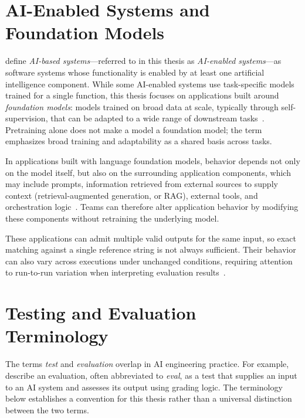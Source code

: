 \section{AI-Enabled Systems and Foundation Models}
\label{sec:background-ai}

\textcite{Martinez:SE4AI:2022} define \emph{AI-based systems}---referred to in
this thesis as \emph{AI-enabled systems}---as software systems whose
functionality is enabled by at least one artificial intelligence component.
While some AI-enabled systems use task-specific models trained for a single
function, this thesis focuses on applications built around \emph{foundation
models}: models trained on broad data at scale, typically through
self-supervision, that can be adapted to a wide range of downstream
tasks~\parencite{Bommasani:FoundationModels:2021}. Pretraining alone does not
make a model a foundation model; the term emphasizes broad training and
adaptability as a shared basis across tasks.

In applications built with language foundation models, behavior depends not
only on the model itself, but also on the surrounding application components,
which may include prompts, information retrieved from external sources to supply
context (retrieval-augmented generation, or RAG), external tools, and
orchestration logic~\parencite{Schluntz:BuildingEffectiveAgents:2024}. Teams
can therefore alter application behavior by modifying these components without
retraining the underlying model.

These applications can admit multiple valid outputs for the same input, so
exact matching against a single reference string is not always sufficient.
Their behavior can also vary across executions under unchanged conditions,
requiring attention to run-to-run variation when interpreting evaluation
results~\parencite{Grace:DemystifyingEvals:2026}.

\section{Testing and Evaluation Terminology}
\label{sec:background-evaluation}

The terms \emph{test} and \emph{evaluation} overlap in AI engineering practice.
For example, \textcite{Grace:DemystifyingEvals:2026} describe an evaluation,
often abbreviated to \emph{eval}, as a test that supplies an input to an AI
system and assesses its output using grading logic. The terminology below
establishes a convention for this thesis rather than a universal distinction
between the two terms.


